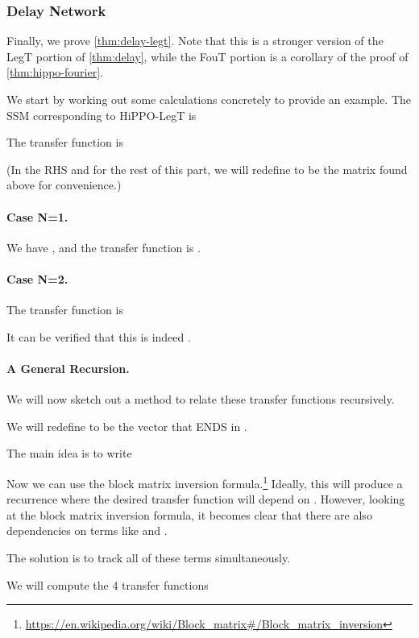 \documentclass{article}
\begin{document}
\subsubsection{Delay Network}

Finally, we prove \cref{thm:delay-legt}.
Note that this is a stronger version of the LegT portion of \cref{thm:delay}, while the FouT portion is a corollary of the proof of \cref{thm:hippo-fourier}.


We start by working out some calculations concretely to provide an example.
The SSM corresponding to HiPPO-LegT is


The transfer function is

(In the RHS and for the rest of this part, we will redefine  to be the  matrix found above for convenience.)


\paragraph{Case N=1.}

We have , and the transfer function is .

\paragraph{Case N=2.}

The transfer function is


It can be verified that this is indeed .



\paragraph{A General Recursion.}
We will now sketch out a method to relate these transfer functions recursively.

We will redefine  to be the vector that ENDS in .

The main idea is to write

Now we can use the block matrix inversion formula.\footnote{\url{https://en.wikipedia.org/wiki/Block_matrix\#/Block_matrix_inversion}}
Ideally, this will produce a recurrence where the desired transfer function  will depend on .
However, looking at the block matrix inversion formula, it becomes clear that there are also dependencies on terms like  and .

The solution is to track all of these terms simultaneously.

We will compute the 4 transfer functions
\end{document}
